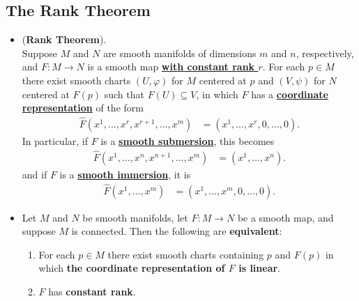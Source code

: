 \documentclass[11pt]{article}
\begin{document}
\subsection{The Rank Theorem}
\begin{itemize}
\item \begin{theorem} (\textbf{Rank Theorem}). \citep{lee2003introduction} \\
Suppose $M$ and $N$ are smooth manifolds of dimensions $m$ and $n$, respectively, and  $F: M \rightarrow N$ is a smooth map \underline{\textbf{with constant rank $r$}}. For each $p \in M$ there exist smooth charts $(U, \varphi)$ for $M$ centered at $p$ and $(V,\psi)$ for $N$ centered at $F(p)$ such that $F(U) \subseteq V$, in which $F$ has a \underline{\textbf{coordinate representation}} of the form
\begin{align}
\widehat{F}(x^1,\ldots, x^r, x^{r+1},\ldots, x^m) &= (x^1,\ldots, x^r, 0,\ldots, 0).  \label{eqn: rank_theorem_coordinate_rep}
\end{align} In particular, if $F$ is a \underline{\textbf{smooth submersion}}, this becomes
\begin{align}
\widehat{F}(x^1,\ldots, x^n, x^{n+1},\ldots, x^m) &=  (x^1,\ldots, x^n).  \label{eqn: rank_theorem_coordinate_rep_subm}
\end{align}
and if $F$ is a \underline{\textbf{smooth immersion}}, it is
\begin{align}
\widehat{F}(x^1,\ldots, x^m) &=  (x^1,\ldots, x^m, 0,\ldots, 0).  \label{eqn: rank_theorem_coordinate_rep_imm}
\end{align}
\end{theorem}

\item \begin{corollary}
Let $M$ and $N$ be smooth manifolds, let  $F: M \rightarrow N$ be a smooth map, and suppose $M$ is connected. Then the following are \textbf{equivalent}:
\begin{enumerate}
\item For each $p \in M$ there exist smooth charts containing $p$ and $F(p)$ in which \textbf{the coordinate representation of $F$ is linear}.
\item $F$ has \textbf{constant rank}.
\end{enumerate}
\end{corollary}


\end{itemize}
\end{document}

